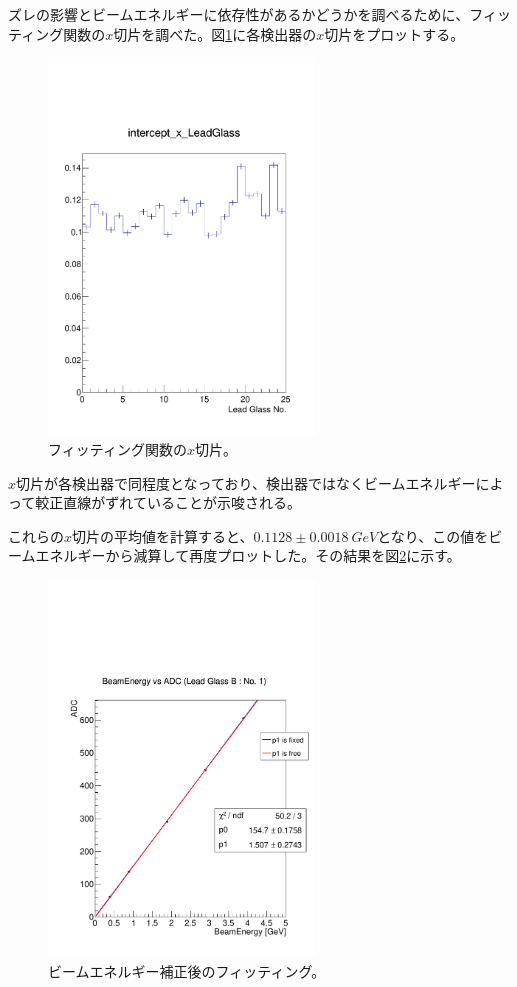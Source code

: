 ズレの影響とビームエネルギーに依存性があるかどうかを調べるために、フィッティング関数の$x$切片を調べた。図\ref{inter_x}に各検出器の$x$切片をプロットする。
\begin{figure}[H]
	\begin{center}
		\includegraphics[width=200pt]{./Figure/EBESAnalysis/calibration_intercept_x.pdf}
		\caption[フィッティング関数の$x$切片]{フィッティング関数の$x$切片。}
		\label{inter_x}
	\end{center}
\end{figure}

$x$切片が各検出器で同程度となっており、検出器ではなくビームエネルギーによって較正直線がずれていることが示唆される。

これらの$x$切片の平均値を計算すると、$0.1128\pm\SI{0.0018}{GeV}$となり、この値をビームエネルギーから減算して再度プロットした。その結果を図\ref{calib_re}に示す。
\begin{figure}[h]
	\begin{center}
		\includegraphics[width=200pt]{./Figure/EBESAnalysis/calibration_re.pdf}
		\caption[ビームエネルギー補正後のフィッティング]{ビームエネルギー補正後のフィッティング。}
		\label{calib_re}
	\end{center}
\end{figure}


